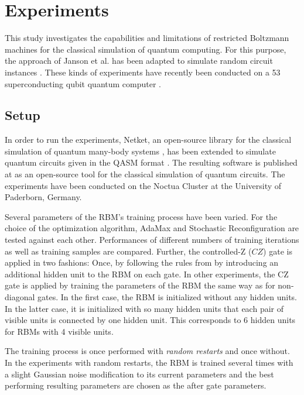 \chapter{Experiments}
\label{sec:experiments}

This study investigates the capabilities and limitations of restricted Boltzmann machines
for the classical simulation of quantum computing. For this purpose, the approach of Janson 
et al. \cite{jnsson2018neuralnetwork} has been adapted to simulate random circuit instances \cite{Boixo2018supremacy}.
These kinds of experiments have recently been conducted on a 53 superconducting qubit quantum computer \cite{martines2019supremacy}.

\section{Setup}
\label{sec:setup}

In order to run the experiments, Netket, an open-source library for the classical simulation of quantum 
many-body systems \cite{netket2019}, has been extended to simulate quantum circuits given in the QASM format \cite{cross2017open}. The resulting 
software is published at \cite{} as an open-source tool for the classical simulation 
of quantum circuits. The experiments have been conducted on the Noctua Cluster at the University of Paderborn, Germany.

Several parameters of the RBM's training process have been varied. For the choice of the optimization algorithm, AdaMax and 
Stochastic Reconfiguration are tested against each other. Performances of different numbers of training iterations 
as well as training samples are compared. Further, the controlled-Z ($CZ$) gate is applied in two fashions: Once, 
by following the rules from \cite{jnsson2018neuralnetwork} by introducing an additional hidden unit to the RBM on each gate. In other 
experiments, the CZ gate is applied by training the parameters of the RBM the same way as for 
non-diagonal gates. In the first case, the RBM is initialized without any hidden units. In the latter 
case, it is initialized with so many hidden units that each pair of visible units is connected 
by one hidden unit. This corresponds to 6 hidden units for RBMs with 4 visible units.

The training process is once performed with \textit{random restarts} and once without. 
In the experiments with random restarts, the RBM is trained several times with a slight Gaussian noise modification to its 
current parameters and the best performing resulting parameters are chosen as the after gate parameters. 

